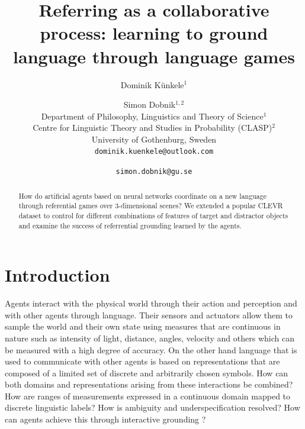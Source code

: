 \documentclass[11pt]{article}
\title{Referring as a collaborative process: learning to ground \\ language through language games} %
\author{Dominik Künkele$^{1}$ \and Simon Dobnik$^{1,2}$ \\
        Department of Philosophy, Linguistics and Theory of Science$^{1}$ \\ 
        Centre for Linguistic Theory and Studies in Probability (CLASP)$^{2}$ \\
        University of Gothenburg, Sweden \\
        \texttt{dominik.kuenkele@outlook.com} \and \texttt{simon.dobnik@gu.se}}
\begin{document}
\maketitle
\begin{abstract}
  How do artificial agents based on neural networks coordinate on a new language through referential games over 3-dimensional scenes?
  We extended a popular CLEVR dataset to control for different combinations of features of target and distractor objects and examine the success of referrential grounding learned by the agents.
\end{abstract}

\section{Introduction}

Agents interact with the physical world through their action and perception and with other agents through language.
Their sensors and actuators %
allow them to sample the world and their own state using measures that are continuous in nature such as intensity of light, distance, angles, velocity and others which can be measured with a high degree of accuracy.
On the other hand language that is used to communicate with other agents is based on representations that are composed of a limited set of discrete and arbitrarily chosen symbols.
How can both domains and representations arising from these interactions be combined? How are ranges of measurements expressed in a continuous domain mapped to discrete linguistic labels?
How is ambiguity and underspecification resolved?
How can agents achieve this through interactive grounding \citep{Regier:1996,Roy:2005,Cooper:2023aa}?


\end{document}
